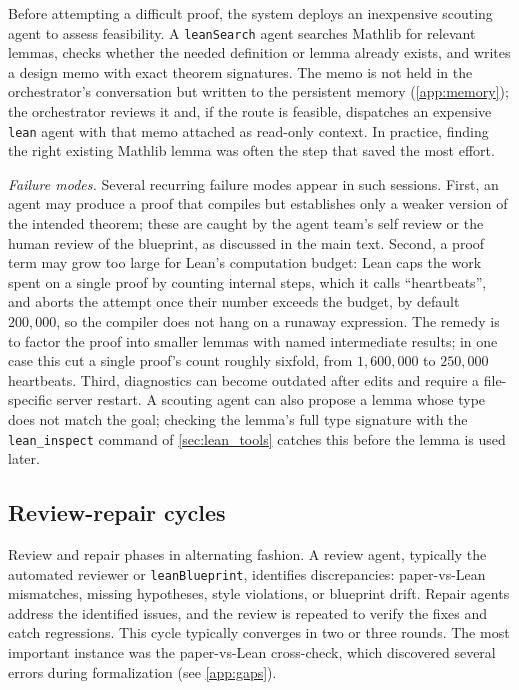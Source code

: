 Before attempting a difficult proof, the system deploys an inexpensive scouting agent to assess feasibility. A \texttt{leanSearch} agent searches Mathlib for relevant lemmas, checks whether the needed definition or lemma already exists, and writes a design memo with exact theorem signatures. The memo is not held in the orchestrator's conversation but written to the persistent memory (\cref{app:memory}); the orchestrator reviews it and, if the route is feasible, dispatches an expensive \texttt{lean} agent with that memo attached as read-only context. In practice, finding the right existing Mathlib lemma was often the step that saved the most effort.

\emph{Failure modes.} Several recurring failure modes appear in such sessions. First, an agent may produce a proof that compiles but establishes only a weaker version of the intended theorem; these are caught by the agent team's self review or the human review of the blueprint, as discussed in the main text. Second, a proof term may grow too large for Lean's computation budget: Lean caps the work spent on a single proof by counting internal steps, which it calls ``heartbeats'', and aborts the attempt once their number exceeds the budget, by default $200{,}000$, so the compiler does not hang on a runaway expression. The remedy is to factor the proof into smaller lemmas with named intermediate results; in one case this cut a single proof's count roughly sixfold, from $1{,}600{,}000$ to $250{,}000$ heartbeats. Third, diagnostics can become outdated after edits and require a file-specific server restart. A scouting agent can also propose a lemma whose type does not match the goal; checking the lemma's full type signature with the \texttt{lean\_inspect} command of \cref{sec:lean_tools} catches this before the lemma is used later.

\subsection{Review-repair cycles}\label{sec:audit_fix}

Review and repair phases in alternating fashion. A review agent, typically the automated reviewer or \texttt{leanBlueprint}, identifies discrepancies: paper-vs-Lean mismatches, missing hypotheses, style violations, or blueprint drift. Repair agents address the identified issues, and the review is repeated to verify the fixes and catch regressions. This cycle typically converges in two or three rounds. The most important instance was the paper-vs-Lean cross-check, which discovered several errors during formalization (see \cref{app:gaps}).

